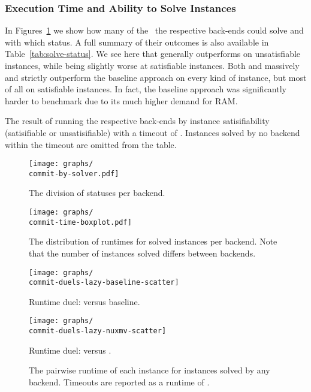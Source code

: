 \documentclass[acmsmall,review,anonymous,screen]{acmart}\settopmatter{printfolios=true,printccs=false,printacmref=true}
\theoremstyle{definition}
\begin{document}
\subsubsection{Execution Time and Ability to Solve Instances}\label{sec:runtime}

In Figures~\ref{fig:solve-division} we show how many of the~\NrBenchmarks{} the
respective back-ends could solve and with which status. A full summary of their
outcomes is also available in Table~\ref{tab:solve-status}. We see here that
\Calculus{} generally outperforms \Nuxmv{} on unsatisfiable instances, while
being slightly worse at satisfiable instances. Both \Nuxmv{} and \Calculus{}
massively and strictly outperform the baseline approach on every kind of
instance, but most of all on satisfiable instances. In fact, the baseline
approach was significantly harder to benchmark due to its much higher demand for
RAM. 

\begin{table}[ht]
  \centering
  
  \caption{The result of running the respective back-ends by instance
  satisifiability (satisifiable or unsatisifiable) with a timeout of
  \RuntimeTimeout. Instances solved by no backend within the timeout are omitted
  from the table. }\label{tab:solve-status}
\end{table}

\begin{figure}
  \texttt{[image: graphs/\\commit-by-solver.pdf]}
  \caption{The division of statuses per backend.}
  \label{fig:solve-division}
\end{figure}


\begin{figure}
  \texttt{[image: graphs/\\commit-time-boxplot.pdf]}
  \caption{The distribution of runtimes for solved instances per backend. Note that the number of instances solved differs between backends.}
  \label{fig:runtime-boxplot}
\end{figure}


\begin{figure}
  \begin{minipage}[b]{0.75\linewidth}
    \centering 
      \texttt{[image: graphs/\\commit-duels-lazy-baseline-scatter]}
      \caption{Runtime duel: \Calculus{} versus baseline.}
      \texttt{[image: graphs/\\commit-duels-lazy-nuxmv-scatter]}
      \caption{Runtime duel: \Calculus{} versus \Nuxmv.}
    \end{minipage}  
  \caption{The pairwise runtime of each instance for instances solved by any backend. Timeouts are reported as a runtime of \RuntimeTimeout.}
  \label{fig:duels}
\end{figure}
\end{document}
